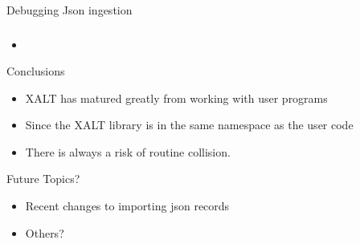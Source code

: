 \documentclass{beamer}
\begin{document}
\begin{frame}{Debugging Json ingestion}
\end{frame}

\begin{frame}[fragile]
    \frametitle{}
 {\tiny
    \begin{semiverbatim}
    \end{semiverbatim}
}
  \begin{itemize}
    \item 
  \end{itemize}

\end{frame}



\begin{frame}{Conclusions}
  \begin{itemize}
    \item XALT has matured greatly from working with user programs
    \item Since the XALT library is in the same namespace as the user code 
    \item There is always a risk of routine collision.
  \end{itemize}
\end{frame}


\begin{frame}{Future Topics?}
  \begin{itemize}
    \item Recent changes to importing json records
    \item Others?
  \end{itemize}
\end{frame}
%

%
\end{document}
